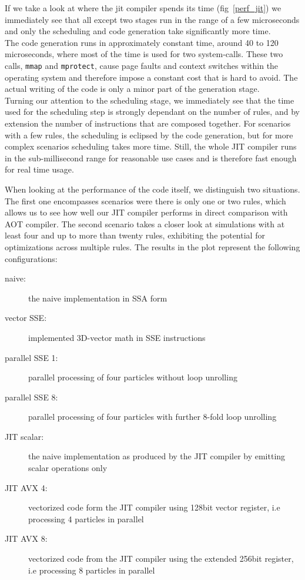 If we take a look at where the jit compiler spends its time (fig~\ref{perf_jit}) we immediately see that all except two stages run in the range of a few microseconds and only the scheduling and code generation take significantly more time. \\
The code generation runs in approximately constant time, around 40 to 120 microseconds, where most of the time is used for two system-calls. These two calls, \texttt{mmap} and \texttt{mprotect}, cause page faults and context switches within the operating system and therefore impose a constant cost that is hard to avoid. The actual writing of the code is only a minor part of the generation stage. \\
Turning our attention to the scheduling stage, we immediately see that the time used for the scheduling step is strongly dependant on the number of rules, and by extension the number of instructions that are composed together. 
For scenarios with a few rules, the scheduling is eclipsed by the code generation, but for more complex scenarios scheduling takes more time.
Still, the whole JIT compiler runs in the sub-millisecond range for reasonable use cases and is therefore fast enough for real time usage.

When looking at the performance of the code itself, we distinguish two situations. The first one encompasses scenarios were there is only one or two rules, which allows us to see how well our JIT compiler performs in direct comparison with AOT compiler. The second scenario takes a closer look at simulations with at least four and up to more than twenty rules, exhibiting the potential for optimizations across multiple rules. The results in the plot represent the following configurations:
\begin{description}
\item[naive:] the naive implementation in SSA form
\item[vector SSE:] implemented 3D-vector math in SSE instructions
\item[parallel SSE 1:] parallel processing of four particles without loop unrolling
\item[parallel SSE 8:] parallel processing of four particles with further 8-fold loop unrolling
\item[JIT scalar:] the naive implementation as produced by the JIT compiler by emitting scalar operations only
\item[JIT AVX 4:] vectorized code form the JIT compiler using 128bit vector register, i.e processing 4 particles in parallel
\item[JIT AVX 8:] vectorized code from the JIT compiler using the extended 256bit register, i.e processing 8 particles in parallel
\end{description}

